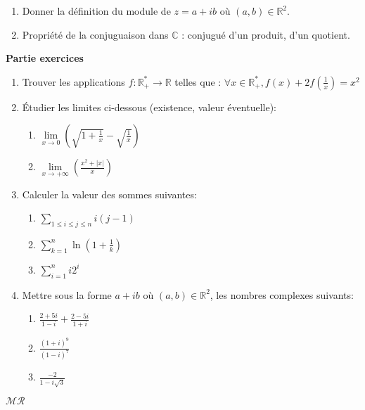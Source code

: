 \documentclass[a4paper,11pt, landscape]{article}
\begin{document}
\begin{multicols*}{4}
\begin{enumerate}[leftmargin=*]
  \item Donner la définition du module de $z = a + ib$ où $(a,b) \in \mathbb{R}^2$.
  \item Propriété de la conjuguaison dans $\mathbb{C}$ : conjugué d'un produit, d'un quotient.
\end{enumerate}
\textbf{Partie exercices}
\begin{enumerate}[leftmargin=*]
  \item Trouver les applications $f: \mathbb{R}^*_+ \rightarrow \mathbb{R}$ telles que : $\forall x \in \mathbb{R}^*_+, f(x) +2f\left(\frac{1}{x}\right) = x^2$
  \item Étudier les limites ci-dessous (existence, valeur éventuelle):
  \begin{enumerate}
    \item $\lim\limits_{x \rightarrow 0 }\left(\sqrt{1+\frac{1}{x}} - \sqrt{\frac{1}{x}}\right)$
    \item $\lim\limits_{x \rightarrow +\infty }\left(\frac{x^2 + |x|}{x}\right)$
  \end{enumerate}
  \item Calculer la valeur des sommes suivantes:
  \begin{enumerate}
    \item $\sum\limits_{1\leq i \leq j \leq n}i(j-1)$
    \item $\sum\limits_{k=1}^{n}\ln\left(1+\frac{1}{k}\right)$
    \item $\sum\limits_{i=1}^ni2^i$
  \end{enumerate}
  \item Mettre sous la forme $a + ib$ où $(a,b) \in \mathbb{R}^2$, les nombres complexes suivants:
  \begin{enumerate}
    \item $\frac{2+5i}{1-i} + \frac{2-5i}{1+i}$
    \item $\frac{(1+i)^9}{(1-i)^7}$
    \item $\frac{-2}{1-i\sqrt{3}}$
  \end{enumerate}
\end{enumerate}
\centerline{$\mathcal{MR}$}

\end{multicols*}
\end{document}
